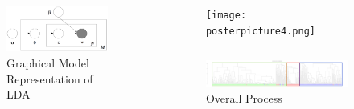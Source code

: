 \documentclass[final]{beamer}
\newlength{\sepwid}
\newlength{\onecolwid}
\newlength{\twocolwid}
\begin{document}
\begin{frame}[t]
\begin{columns}[t]
\begin{column}{\onecolwid}
\begin{figure}
\includegraphics[width=0.5\linewidth]{LDA.png}
\caption{Graphical Model Representation of LDA}
\end{figure}


\end{column} %

\begin{column}{\sepwid}\end{column} %

\begin{column}{\twocolwid} %
\begin{figure}
\texttt{[image: posterpicture4.png]}
\end{figure}

\begin{column}{\twocolwid} %
\begin{figure}
\includegraphics[width=1\linewidth]{dendo_3-1.png}
\caption{Overall Process}
\end{figure}

\end{column}

\begin{columns}[t,totalwidth=\twocolwid]\hspace{-0.6in} %

\begin{column}{\onecolwid} %



\end{column}
\end{columns}
\end{column}
\end{columns}
\end{frame}
\end{document}
